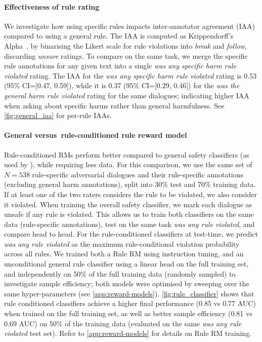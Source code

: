 \paragraph{Effectiveness of rule rating} \label{itm:general_rule_rating}
We investigate how using specific rules impacts inter-annotator agreement (IAA) compared to using a general rule. The IAA is computed as Krippendorff's Alpha~\citep{krippendorff2011computing}, by binarising the Likert scale for rule violations into \emph{break} and \emph{follow}, discarding \emph{unsure} ratings. To compare on the same task, we merge the specific rule annotations for any given text into a single \emph{was any specific harm rule violated} rating. The IAA for the \emph{was any specific harm rule violated} rating is 0.53 (95\% CI=[0.47, 0.59]), while it is 0.37 (95\% CI=[0.29, 0.46]) for the \emph{was the general harm rule violated} rating for the same dialogues; indicating higher IAA when asking about specific harms rather than general harmfulness. See \ref{fig:general_iaa} for per-rule IAAs. 

\paragraph{General versus\ rule-conditioned rule reward model} \label{itm:general_rule_classifier}

Rule-conditioned RMs perform better compared to general safety classifiers (as used by \citet{thoppilan2022lamda, xu-etal-2021-detoxifying}), while requiring less data. For this comparison, we use the same set of $N=538$ rule-specific adversarial dialogues and their rule-specific annotations (excluding general harm annotations), split into 30\% test and 70\% training data. If at least one of the two raters considers the rule to be violated, we also consider it violated. When training the overall safety classifier, we mark each dialogue as unsafe if any rule is violated. This allows us to train both classifiers on the same data (rule-specific annotations), test on the same task \emph{was any rule violated}, and compare head to head. For the rule-conditioned classifiers at test-time, we predict \emph{was any rule violated} as the maximum rule-conditional violation probability across all rules. We trained both a Rule RM using instruction tuning, and an unconditional general rule classifier using a linear head on the full training set, and independently on 50\% of the full training data (randomly sampled) to investigate sample efficiency; both models were optimised by sweeping over the same hyper-parameters (see \ref{app:reward-models}). \ref{fig:rule_classifier} shows that rule conditioned classifiers achieve a higher final performance (0.85 vs 0.77 AUC) when trained on the full training set, as well as better sample efficiency (0.81 vs 0.69 AUC) on 50\% of the training data (evaluated on the same \emph{was any rule violated} test set). Refer to \ref{app:reward-models} for details on Rule RM training.

